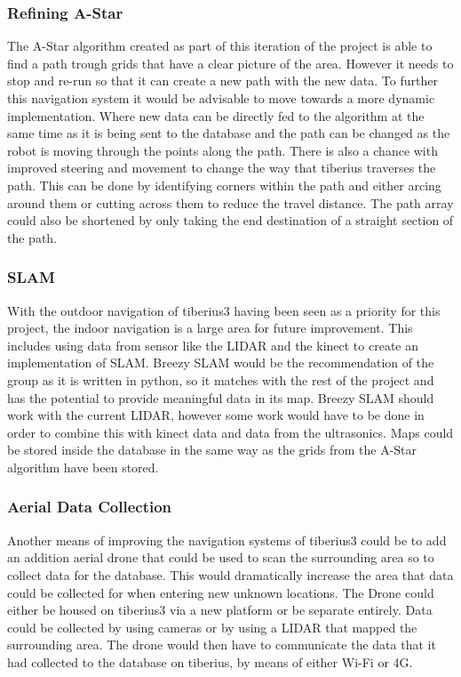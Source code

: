 \subsubsection{Refining A-Star}
The A-Star algorithm created as part of this iteration of the project is able to find a path trough grids that have a clear picture of the area. However it needs to stop and re-run so that it can create a new path with the new data. To further this navigation system it would be advisable to move towards a more dynamic implementation. Where new data can be directly fed to the algorithm at the same time as it is being sent to the database and the path can be changed as the robot is moving through the points along the path.
There is also a chance with improved steering and movement to change the way that tiberius traverses the path. This can be done by identifying corners within the path and either arcing around them or cutting across them to reduce the travel distance. The path array could also be shortened by only taking the end destination of a straight section of the path.
\subsubsection{\gls{SLAM}}
With the outdoor navigation of \gls{tiberius3} having been seen as a priority for this project, the indoor navigation is a large area for future improvement. This includes using data from sensor like the \gls{LIDAR} and the kinect to create an implementation of \gls{SLAM}. Breezy \gls{SLAM} would be the recommendation of the group as it is written in python, so it matches with the rest of the project and has the potential to provide meaningful data in its map. Breezy \gls{SLAM} should work with the current \gls{LIDAR}, however some work would have to be done in order to combine this with kinect data and data from the ultrasonics. Maps could be stored inside the database in the same way as the grids from the A-Star algorithm have been stored.
\subsubsection{Aerial Data Collection}
Another means of improving the navigation systems of \gls{tiberius3} could be to add an addition aerial drone that could be used to scan the surrounding area so to collect data for the database. This would dramatically increase the area that data could be collected for when entering new unknown locations. The Drone could either be housed on \gls{tiberius3} via a new platform or be separate entirely. Data could be collected by using cameras or by using a \gls{LIDAR} that mapped the surrounding area. The drone would then have to communicate the data that it had collected to the database on tiberius, by means of either Wi-Fi or 4G. 


















